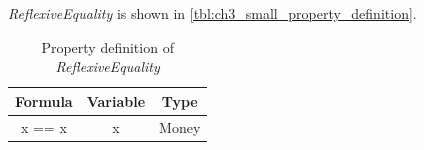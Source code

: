 \textit{ReflexiveEquality} is shown in
\autoref{tbl:ch3_small_property_definition}.
\begin{table}[!ht]
\centering
\begin{tabular}{ccc}
\hline
\textbf{Formula}               & \textbf{Variable} & \textbf{Type} \\ \hline
\rowcolor[HTML]{EFEFEF} x == x & x                 & Money         \\ \hline
\end{tabular}
\caption{Property definition of \textit{ReflexiveEquality}}
\label{tbl:ch3_small_property_definition}
\end{table}
\FloatBarrier\noindent

